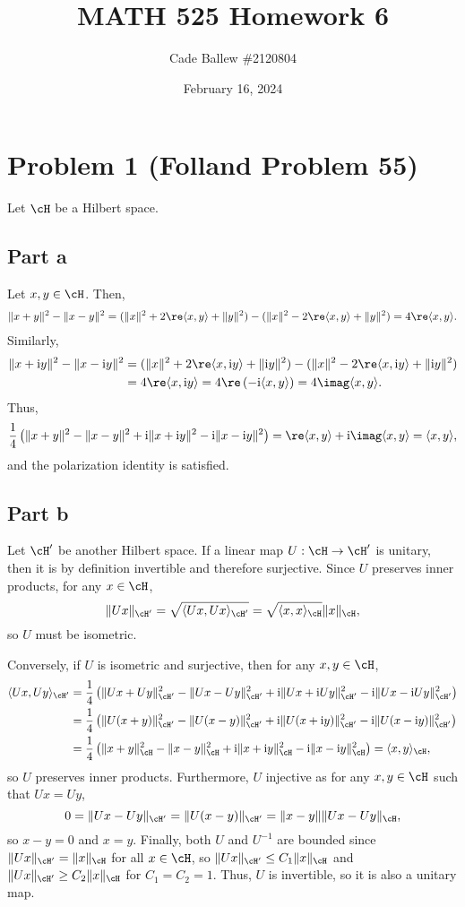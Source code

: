 \documentclass{article}
\title{MATH 525 Homework 6}
\author{Cade Ballew \#2120804}
\date{February 16, 2024}
\begin{document}
	
\maketitle
	
\section{Problem 1 (Folland Problem 55)}
Let $\cH$ be a Hilbert space.

\subsection{Part a}
Let $x,y\in\cH$. Then, 
\begin{align*}
\|x+y\|^2-\|x-y\|^2=(\|x\|^2+2\re\langle x,y\rangle+\|y\|^2)-(\|x\|^2-2\re\langle x,y\rangle+\|y\|^2)=4\re\langle x,y\rangle.
\end{align*}
Similarly, 
\begin{align*}
\|x+\im y\|^2-\|x-\im y\|^2&=(\|x\|^2+2\re\langle x,\im y\rangle+\|\im y\|^2)-(\|x\|^2-2\re\langle x,\im y\rangle+\|\im y\|^2)\\&=
4\re\langle x,\im y\rangle=4\re\left(-\im \langle x,y\rangle\right)=4\imag\langle x,y\rangle.
\end{align*}
Thus,
\[
\frac{1}{4}\left(\|x+y\|^2-\|x-y\|^2+\im\|x+\im y\|^2-\im\|x-\im y\|^2\right)=\re\langle x,y\rangle+\im\imag\langle x,y\rangle=\langle x, y\rangle,
\]
and the polarization identity is satisfied.

\subsection{Part b}
Let $\cH'$ be another Hilbert space. If a linear map $U:\cH\to\cH'$ is unitary, then it is by definition invertible and therefore surjective. Since $U$ preserves inner products, for any $x\in\cH$,
\[
\|Ux\|_{\cH'}=\sqrt{\langle Ux,Ux\rangle_{\cH'}}=\sqrt{\langle x,x\rangle_{\cH}}\|x\|_{\cH},
\]
so $U$ must be isometric.

Conversely, if $U$ is isometric and surjective, then for any $x,y\in\cH$, 
\begin{align*}
\langle Ux,Uy\rangle_{\cH'}&=\frac{1}{4}\left(\|Ux+Uy\|^2_{\cH'}-\|Ux-Uy\|^2_{\cH'}+\im\|Ux+\im Uy\|^2_{\cH'}-\im\|Ux-\im Uy\|^2_{\cH'}\right)\\&=
\frac{1}{4}\left(\|U(x+y)\|^2_{\cH'}-\|U(x-y)\|^2_{\cH'}+\im\|U(x+\im y)\|^2_{\cH'}-\im\|U(x-\im y)\|^2_{\cH'}\right)\\&=
\frac{1}{4}\left(\|x+y\|^2_{\cH}-\|x-y\|^2_{\cH}+\im\|x+\im y\|^2_{\cH}-\im\|x-\im y\|^2_{\cH}\right)=\langle x,y\rangle_{\cH},
\end{align*}
so $U$ preserves inner products. Furthermore, $U$ injective as for any $x,y\in\cH$ such that $Ux=Uy$,
\[
0=\|Ux-Uy\|_{\cH'}=\|U(x-y)\|_{\cH'}=\|x-y\|\|Ux-Uy\|_{\cH},
\]
so $x-y=0$ and $x=y$. Finally, both $U$ and $U^{-1}$ are bounded since $\|Ux\|_{\cH'}=\|x\|_{\cH}$ for all $x\in\cH$, so $\|Ux\|_{\cH'}\leq C_1\|x\|_{\cH}$ and $\|Ux\|_{\cH'}\geq C_2\|x\|_{\cH}$ for $C_1=C_2=1$. Thus, $U$ is invertible, so it is also a unitary map.
\end{document}
